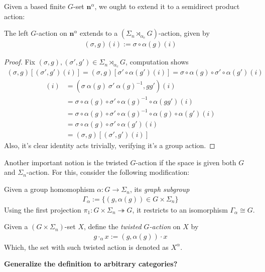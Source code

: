 \documentclass{article}
\begin{document}
\hfil

Given a based finite $G$-set $\mathbf{n}^\alpha$, we ought to extend it to a semidirect product action:
\begin{lem}
    The left $G$-action on $\mathbf{n}^\alpha$ extends to a $(\Sigma_n\rtimes_{\alpha_c}G)$-action, given by 
    \begin{align*}
        (\sigma,g)(i):= \sigma\circ \alpha(g)(i)
    \end{align*}
\end{lem}
\begin{proof}
    Fix $(\sigma,g),(\sigma',g')\in \Sigma_n\rtimes_{\alpha_c}G$, computation shows
    \begin{align*}
        (\sigma,g)[(\sigma',g')(i)] = (\sigma,g)[\sigma'\circ\alpha(g')(i)] = \sigma\circ \alpha(g)\circ \sigma'\circ \alpha(g')(i)
    \end{align*}
    \begin{align*}
        [(\sigma,g)\cdot (\sigma',g')](i) &= (\sigma\ \alpha(g)\ \sigma'\ \alpha(g)^{-1},gg')(i)\\ 
        &= \sigma\circ \alpha(g)\circ \sigma'\circ \alpha(g)^{-1}\circ \alpha(gg')(i)\\
        &= \sigma\circ \alpha(g)\circ \sigma'\circ \alpha(g)^{-1}\circ \alpha(g)\circ \alpha(g')(i)\\
        &= \sigma\circ \alpha(g)\circ \sigma'\circ \alpha(g')(i)\\
        &= (\sigma,g)[(\sigma',g')(i)]
    \end{align*}
    Also, it's clear identity acts trivially, verifying it's a group action.
\end{proof}

\hfil

Another important notion is the twisted $G$-action if the space is given both $G$ and $\Sigma_n$-action. For this, consider the following modification:
\begin{defn}
    Given a group homomophism $\alpha:G\rightarrow\Sigma_n$, its \emph{graph subgroup}
    \begin{align*}
        \Gamma_\alpha:= \{(g,\alpha(g))\in G\times \Sigma_n\}
    \end{align*}
    Using the first projection $\pi_1:G\times\Sigma_n\twoheadrightarrow G$, it restricts to an isomorphism $\Gamma_\alpha\cong G$.

    \hfil

    Given a $(G\times \Sigma_n)$-set $X$, define the \emph{twisted $G$-action} on $X$ by 
    \begin{align*}
        g\cdot_\alpha x:= (g,\alpha(g))\cdot x
    \end{align*}
    Which, the set with such twisted action is denoted as $X^\alpha$.
\end{defn}
\textbf{Generalize the definition to arbitrary categories?}
\end{document}
